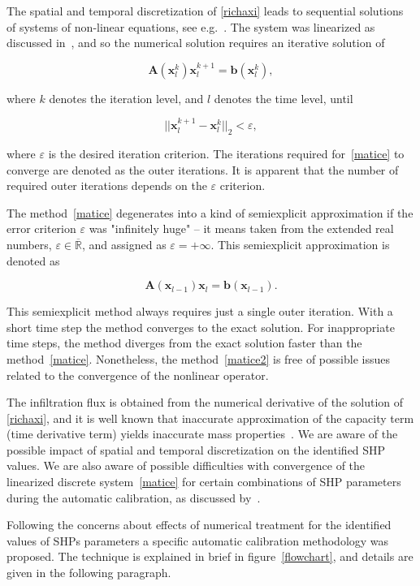 \documentclass[review]{elsarticle}
\newenvironment{lineq}
    {\begin{linenomath*}
    \begin{equation}
    }
    { 
    \end{equation} 
    \end{linenomath*}
    }
\renewcommand{\vec}{\mathbf}
\begin{document}
 
 The spatial and temporal discretization of \eqref{richaxi} leads to sequential solutions of systems of non-linear equations, see e.g.~\citep{mojecomp}. The system was linearized as discussed in~\citet{mojeacta, mojeamc}, and so the numerical solution requires an iterative solution of 
\begin{lineq}
\label{matice}
\mathbf{A}(\vec{x}_l^k) \vec{x}_l^{k+1} = \vec{b}(\vec{x}_l^k),
\end{lineq}
where $k$ denotes the iteration level, and $l$ denotes the time level, until \begin{lineq} \label{picard} ||\vec{x}_l^{k+1} - \vec{x}_l^k||_2 < \varepsilon , \end{lineq} where $\varepsilon$ is the desired iteration criterion. The iterations required for~\eqref{matice} to converge are denoted as the outer iterations. It is apparent that the number of required outer iterations depends on the $\varepsilon$ criterion. 


The method~\eqref{matice} degenerates into a kind of semiexplicit approximation if the error criterion $\varepsilon$ was "infinitely huge" -- it means taken from the extended real numbers, $\varepsilon \in {\overline {\mathbb {R} }}$, and assigned as $\varepsilon = + \infty$. This semiexplicit approximation is denoted as
\begin{lineq}
\label{matice2}
\mathbf{A}(\vec{x}_{l-1}) \vec{x}_l = \vec{b}(\vec{x}_{l-1}).
\end{lineq}
 This semiexplicit method always requires just a single outer iteration. With a short time step the method converges to the exact solution. For inappropriate time steps, the method diverges from the exact solution faster than the method~\eqref{matice}. Nonetheless, the method~\eqref{matice2} is free of possible issues related to the convergence of the nonlinear operator.

The infiltration flux is obtained from the numerical derivative of the solution of \eqref{richaxi},  and  it is well known that inaccurate approximation of the capacity term (time derivative term) yields inaccurate mass properties~\citep{celia}. We are aware of the possible impact of spatial and temporal discretization on the identified SHP values. We are also aware of possible difficulties with convergence of the linearized discrete system~\eqref{matice} for certain combinations of SHP parameters during the automatic calibration, as discussed by~\cite{beven2003-uncertain}.

Following the concerns about  effects of numerical treatment for the identified values of SHPs parameters a specific  automatic calibration methodology was proposed. The technique is explained in brief in figure~\ref{flowchart}, and  details are given in the following paragraph.
 
\end{document}
